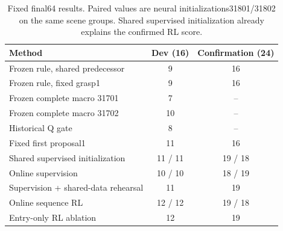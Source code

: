
\begin{table}[t]
\centering
\begin{tabular}{lcc}
\hline
Method & Dev (16) & Confirmation (24) \\
\hline
Frozen rule, shared predecessor & 9 & 16 \\
Frozen rule, fixed grasp1 & 9 & 16 \\
Frozen complete macro 31701 & 7 & -- \\
Frozen complete macro 31702 & 10 & -- \\
Historical Q gate & 8 & -- \\
Fixed first proposal1 & 11 & 16 \\
Shared supervised initialization & 11 / 11 & 19 / 18 \\
Online supervision & 10 / 10 & 18 / 19 \\
Supervision + shared-data rehearsal & 11 & 19 \\
Online sequence RL & 12 / 12 & 19 / 18 \\
Entry-only RL ablation & 12 & 19 \\
\hline
\end{tabular}
\caption{Fixed final64 results. Paired values are neural initializations31801/31802 on the same scene groups. Shared supervised initialization already explains the confirmed RL score.}
\end{table}
